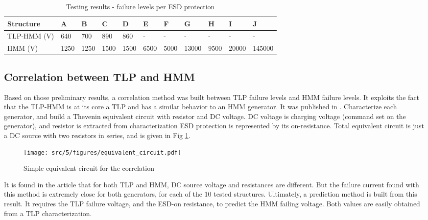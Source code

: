 \begin{table}[!h]
\centering
\begin{tabular}{@{}lllllllllll@{}}
\toprule
Structure   & A     & B     & C      & D    & E    & F    & G     & H    & I     & J      \\ \midrule
TLP-HMM (V) & 640   & 700   & 890    & 860  & -    & -    & -     & -    & -     & -      \\
HMM     (V) & 1250  & 1250  & 1500   & 1500 & 6500 & 5000 & 13000 & 9500 & 20000 & 145000 \\
\end{tabular}
\caption{Testing results - failure levels per ESD protection}
\label{tab:esd-protections}
\end{table}

\subsection{Correlation between TLP and HMM}

Based on those preliminary results, a correlation method was built between TLP failure levels and HMM failure levels.
It exploits the fact that the TLP-HMM is at its core a TLP and has a similar behavior to an HMM generator.
It was published in \cite{my-publi-tlp-hmm}.
Characterize each generator, and build a Thevenin equivalent circuit with resistor and DC voltage.
DC voltage is charging voltage (command set on the generator), and resistor is extracted from characterization
ESD protection is represented by its on-resistance.
Total equivalent circuit is just a DC source with two resistors in series, and is given in Fig \ref{fig:simple_equivalent_circuit}.

\begin{figure}[!h]
  \centering
  \texttt{[image: src/5/figures/equivalent\_circuit.pdf]}
  \caption{Simple equivalent circuit for the correlation}
  \label{fig:simple_equivalent_circuit}
\end{figure}

It is found in the article that for both TLP and HMM, DC source voltage and resistances are different.
But the failure current found with this method is extremely close for both generators, for each of the 10 tested structures.
Ultimately, a prediction method is built from this result.
It requires the TLP failure voltage, and the ESD-on resistance, to predict the HMM failing voltage.
Both values are easily obtained from a TLP characterization.

